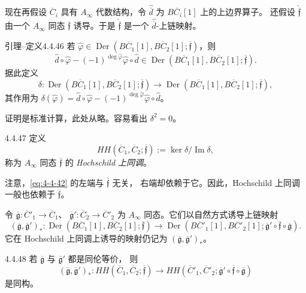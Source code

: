 现在再假设 $\overline C_i$ 具有 $A_\infty$ 代数结构，令
$\widehat{\overline d}$ 为 $B\overline C_i[1]$ 上的上边界算子。
还假设 $\widehat{\overline{\mathfrak f}}$ 由一个 $A_\infty$ 同态
$\overline{\mathfrak f}$ 诱导。于是
$\widehat{\overline{\mathfrak f}}$ 是一个
$\widehat{\overline d}$-上链映射。

\begin{statement}{引理--定义}{4.4.46}\label{lem-def:4-4-46}
若
$\widehat\varphi\in
\operatorname{Der}(B\overline C_1[1],B\overline C_2[1];
\overline{\mathfrak f})$，则
\[
 \widehat d\circ\widehat\varphi
 -(-1)^{\deg\widehat\varphi}
 \widehat\varphi\circ\widehat d
 \in\operatorname{Der}(B\overline C_1[1],B\overline C_2[1];
 \overline{\mathfrak f}).
\]
据此定义
\[
 \delta\colon
 \operatorname{Der}(B\overline C_1[1],B\overline C_2[1];
 \overline{\mathfrak f})
 \longrightarrow
 \operatorname{Der}(B\overline C_1[1],B\overline C_2[1];
 \overline{\mathfrak f}),
\]
其作用为
$\delta(\widehat\varphi)=
\widehat d\circ\widehat\varphi
-(-1)^{\deg\widehat\varphi}\widehat\varphi\circ\widehat d$。
\end{statement}

证明是标准计算，此处从略。容易看出 $\delta^2=0$。

\begin{definition}{4.4.47}\label{def:4-4-47}
定义
\[
 HH(\overline C_1,\overline C_2;\overline{\mathfrak f})
 :=\ker\delta/\operatorname{Im}\delta,
\]
称为 $A_\infty$ 同态 $\overline{\mathfrak f}$ 的
\emph{Hochschild 上同调}。
\end{definition}

注意，\eqref{eq:4-4-42} 的左端与 $\overline{\mathfrak f}$ 无关，
右端却依赖于它。因此，Hochschild 上同调一般也依赖于
$\overline{\mathfrak f}$。

令
$\overline{\mathfrak g}\colon\overline C'_1\to\overline C_1$、
$\overline{\mathfrak g}'\colon\overline C_2\to\overline C'_2$
为 $A_\infty$ 同态。它们以自然方式诱导上链映射
\[
 (\overline{\mathfrak g},\overline{\mathfrak g}')_*
 \colon
 \operatorname{Der}(B\overline C_1[1],B\overline C_2[1];
 \overline{\mathfrak f})
 \longrightarrow
 \operatorname{Der}(B\overline C'_1[1],B\overline C'_2[1];
 \overline{\mathfrak g}'\circ\overline{\mathfrak f}
 \circ\overline{\mathfrak g}).
\]
它在 Hochschild 上同调上诱导的映射仍记为
$(\overline{\mathfrak g},\overline{\mathfrak g}')_*$。

\begin{proposition}{4.4.48}\label{prop:4-4-48}
若 $\overline{\mathfrak g}$ 与 $\overline{\mathfrak g}'$ 都是同伦等价，
则
\[
 (\overline{\mathfrak g},\overline{\mathfrak g}')_*
 \colon HH(\overline C_1,\overline C_2;\overline{\mathfrak f})
 \longrightarrow
 HH(\overline C'_1,\overline C'_2;
 \overline{\mathfrak g}'\circ\overline{\mathfrak f}
 \circ\overline{\mathfrak g})
\]
是同构。
\end{proposition}


